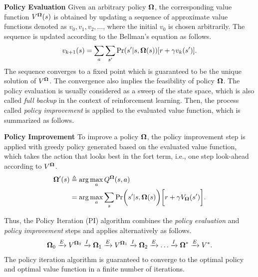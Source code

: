 \noindent\textbf{Policy Evaluation}
Given an arbitrary policy $\boldsymbol{\Omega}$, the corresponding value function $V^{\boldsymbol{\Omega}}(s)$ is obtained by updating a sequence of approximate value functions denoted as $v_0, v_1, v_2, \dots$, where the initial $v_0$ is chosen arbitrarily.
The sequence is updated according to the Bellman's equation as follows.
\begin{align*}
    v_{k+1}(s) = \sum_{a} \sum_{s'} \Pr( s' | s, \boldsymbol{\Omega}(s) )[ r + \gamma v_{k}(s') ].
\end{align*}
The sequence converges to a fixed point which is guaranteed to be the unique solution of $V^{\boldsymbol{\Omega}}$.
The convergence also implies the feasibility of policy $\boldsymbol{\Omega}$.
The policy evaluation is usually considered as a sweep of the state space, which is also called \emph{full backup} in the context of reinforcement learning.
Then, the process called \emph{policy improvement} is applied to the evaluated value function, which is summarized as follows.

\noindent\textbf{Policy Improvement}
To improve a policy $\boldsymbol{\Omega}$, the policy improvement step is applied with greedy policy generated based on the evaluated value function, which takes the action that looks best in the fort term, i.e., one step look-ahead according to $V^{\boldsymbol{\Omega}}$.
\begin{align*}
    \Policy'(s) &\define \arg\max_{a} Q^{\Policy}(s,a)
    \nonumber\\
    &= \arg\max_{a} \sum_{s} \Pr\Paren{ s' | s, \Policy(s) } \Bracket{ r + \gamma V_{\Policy}(s') }.
\end{align*}

Thus, the Policy Iteration (PI) algorithm combines the \emph{policy evaluation} and \emph{policy improvement} steps and applies alternatively as follows.
\begin{align*}
    \boldsymbol{\Omega}_0 \xrightarrow{E} V^{\boldsymbol{\Omega}_0} \xrightarrow{I} \boldsymbol{\Omega}_1
        \xrightarrow{E} V^{\boldsymbol{\Omega}_1} \xrightarrow{I} \boldsymbol{\Omega}_2
        \xrightarrow{E} \dots     \xrightarrow{I} \boldsymbol{\Omega}^*
        \xrightarrow{E} V^*.
\end{align*}
The policy iteration algorithm is guaranteed to converge to the optimal policy and optimal value function in a finite number of iterations.

